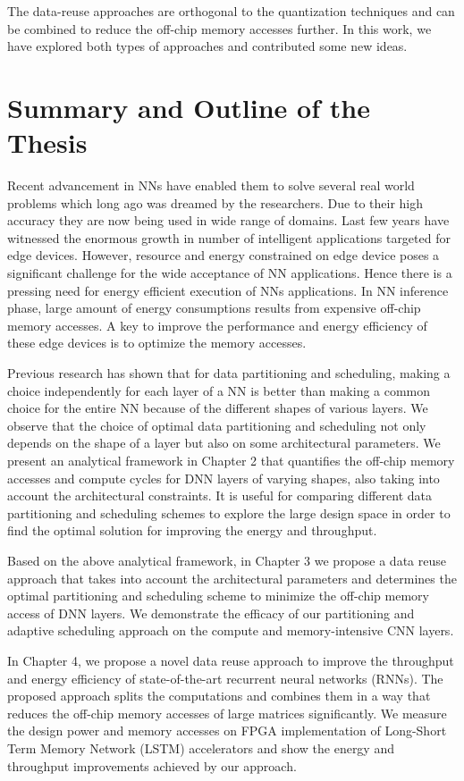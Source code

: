 The data-reuse approaches are orthogonal to the quantization techniques and can be combined to reduce the off-chip memory accesses further. In this work, we have explored both types of approaches and contributed some new ideas.

\section{Summary and Outline of the Thesis} 
Recent advancement in NNs have enabled them to solve several real world problems which long ago was dreamed by the researchers. Due to their high accuracy they are now being used in wide range of domains. Last few years have witnessed the enormous growth in number of intelligent applications targeted for edge devices. However, resource and energy constrained on edge device poses a significant challenge for the wide acceptance of NN applications. Hence there is a pressing need for energy efficient execution of NNs applications. In NN inference phase, large amount of energy consumptions results from expensive off-chip memory accesses. A key to improve the performance and energy efficiency of these edge devices is to optimize the memory accesses.
 
Previous research has shown that for data partitioning and scheduling, making a choice independently for each layer of a NN is better than making a common choice for the entire NN because of the different shapes of various layers. We observe that the choice of optimal data partitioning and scheduling not only depends on the shape of a layer but also on some architectural parameters. We present an analytical framework in Chapter 2 that quantifies the off-chip memory accesses and compute cycles for DNN layers of varying shapes, also taking into account the architectural constraints. It is useful for comparing different data partitioning and scheduling schemes to explore the large design space in order to find the optimal solution for improving the energy and throughput. 

Based on the above analytical framework, in Chapter 3 we propose a data reuse approach that takes into account the architectural parameters and determines the optimal partitioning and scheduling scheme to minimize the off-chip memory access of DNN layers. We demonstrate the efficacy of our partitioning and adaptive scheduling approach on the compute and memory-intensive CNN layers. 

In Chapter 4, we propose a novel data reuse approach to improve the throughput and energy efficiency of state-of-the-art recurrent neural networks (RNNs). The proposed approach splits the computations and combines them in a way that reduces the off-chip memory accesses of large matrices significantly. We measure the design power and memory accesses on FPGA implementation of Long-Short Term Memory Network (LSTM) accelerators and show the energy and throughput improvements achieved by our approach.
	
